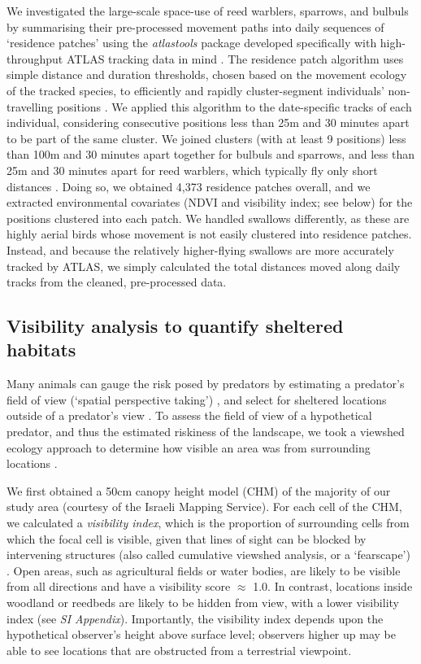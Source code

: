 \begin{refsection}
We investigated the large-scale space-use of reed warblers, sparrows, and bulbuls by summarising their pre-processed movement paths into daily sequences of `residence patches' using the \textit{atlastools} package developed specifically with high-throughput ATLAS tracking data in mind \citep{gupte2022d}.
The residence patch algorithm uses simple distance and duration thresholds, chosen based on the movement ecology of the tracked species, to efficiently and rapidly cluster-segment individuals' non-travelling positions \citep{gupte2022d}.
We applied this algorithm to the date-specific tracks of each individual, considering consecutive positions less than 25m and 30 minutes apart to be part of the same cluster.
We joined clusters (with at least 9 positions) less than 100m and 30 minutes apart together for bulbuls and sparrows, and less than 25m and 30 minutes apart for reed warblers, which typically fly only short distances \cite{kiat2016}.
Doing so, we obtained 4,373 residence patches overall, and we extracted environmental covariates (NDVI and visibility index; see below) for the positions clustered into each patch.
We handled swallows differently, as these are highly aerial birds whose movement is not easily clustered into residence patches.
Instead, and because the relatively higher-flying swallows are more accurately tracked by ATLAS, we simply calculated the total distances moved along daily tracks from the cleaned, pre-processed data.

\subsection{Visibility analysis to quantify sheltered habitats}

Many animals can gauge the risk posed by predators by estimating a predator's field of view (`spatial perspective taking') \cite{emery2000,bruce2003,davidson2016}, and select for sheltered locations outside of a predator's view \citep{hampton1994,krams2001,watve2002}.
To assess the field of view of a hypothetical predator, and thus the estimated riskiness of the landscape, we took a viewshed ecology approach to determine how visible an area was from surrounding locations \citep{aben2018,aben2021}.

We first obtained a 50cm canopy height model (CHM) \citep{aben2021} of the majority of our study area (courtesy of the Israeli Mapping Service).
For each cell of the CHM, we calculated a \textit{visibility index}, which is the proportion of surrounding cells from which the focal cell is visible, given that lines of sight can be blocked by intervening structures (also called cumulative viewshed analysis, or a `fearscape') \cite{olsoy2015}.
Open areas, such as agricultural fields or water bodies, are likely to be visible from all directions and have a visibility score $\approx$ 1.0.
In contrast, locations inside woodland or reedbeds are likely to be hidden from view, with a lower visibility index (see \textit{SI Appendix}).
Importantly, the visibility index depends upon the hypothetical observer's height above surface level; observers higher up may be able to see locations that are obstructed from a terrestrial viewpoint.


\end{refsection}

